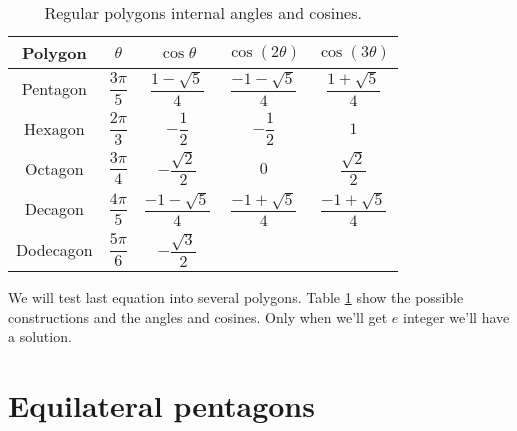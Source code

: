 \documentclass[11pt]{article}
\begin{document}
\begin{table}[h]
\centering
\begin{tabular}{|c c c c c|}\hline
Polygon & $\theta$ & $\cos\theta$ & $\cos(2\theta)$ & $\cos(3\theta)$ \rule[-2ex]{0pt}{6ex}\\ \hline\hline 
Pentagon & $\dfrac{3\pi}{5}$ & $\dfrac{1-\sqrt{5}}{4}$ & $\dfrac{-1-\sqrt{5}}{4}$ & $\dfrac{1+\sqrt{5}}{4}$\rule[-2ex]{0pt}{6ex}\\ \hline
Hexagon & $\dfrac{2\pi}{3}$ & $-\dfrac{1}{2}$ & $-\dfrac{1}{2}$ & $1$ \rule[-2ex]{0pt}{6ex}\\ \hline
Octagon & $\dfrac{3\pi}{4}$ & $-\dfrac{\sqrt{2}}{2}$ & $0$ & $\dfrac{\sqrt{2}}{2}$ \rule[-2ex]{0pt}{6ex}\\ \hline
Decagon & $\dfrac{4\pi}{5}$ & $\dfrac{-1-\sqrt{5}}{4}$ & $\dfrac{-1+\sqrt{5}}{4}$ & $\dfrac{-1+\sqrt{5}}{4}$ \rule[-2ex]{0pt}{6ex}\\ \hline
Dodecagon & $\dfrac{5\pi}{6}$ & $-\dfrac{\sqrt{3}}{2}$ &  & \rule[-2ex]{0pt}{6ex}\\ \hline

\end{tabular}
\caption{Regular polygons internal angles and cosines.}
\label{tbl:polygons}
\end{table}

We will test last equation into several polygons. Table \ref{tbl:polygons}
show the possible constructions and the angles and cosines.
Only when we'll get $e$ integer we'll have a solution.

\section{Equilateral pentagons}
\end{document}
